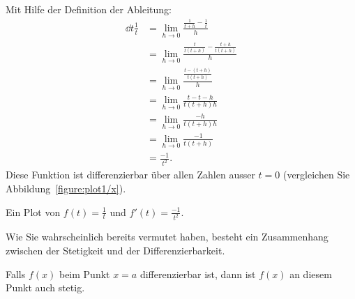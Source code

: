\begin{solution}
Mit Hilfe der Definition der Ableitung:
\begin{align*}
\dd{t}\frac{1}{t}&=\lim_{ h\to0}\frac{\frac{1}{t+ h} - \frac{1}{t}}{h} \\
&=\lim_{h\to0}\frac{\frac{t}{t(t+ h)} - \frac{t+ h}{t(t+ h)}}{h} \\
&=\lim_{h\to0}\frac{\frac{t-(t+ h)}{t(t+ h)}}{h} \\
&=\lim_{h\to0}\frac{t-t- h}{t(t+ h) h} \\
&=\lim_{h\to0}\frac{- h}{t(t+ h) h} \\
&=\lim_{h\to0}\frac{-1}{t(t+ h)}\\
&=\frac{-1}{t^2}.
\end{align*}
Diese Funktion ist differenzierbar über allen Zahlen ausser $t=0$ (vergleichen Sie Abbildung~\ref{figure:plot1/x}).
\end{solution}
\begin{marginfigure}
\caption{Ein Plot von $f(t) = \frac{1}{t}$ und $f'(t) = \frac{-1}{t^2}$.}
\label{figure:plot1/x}
\end{marginfigure}

Wie Sie wahrscheinlich bereits vermutet haben, besteht ein Zusammenhang zwischen der Stetigkeit und der Differenzierbarkeit.



\begin{mainTheorem}\label{theorem:diff-cont}
Falls $f(x)$ beim Punkt $x=a$ differenzierbar ist, dann ist $f(x)$ an diesem Punkt auch stetig.
\end{mainTheorem}

